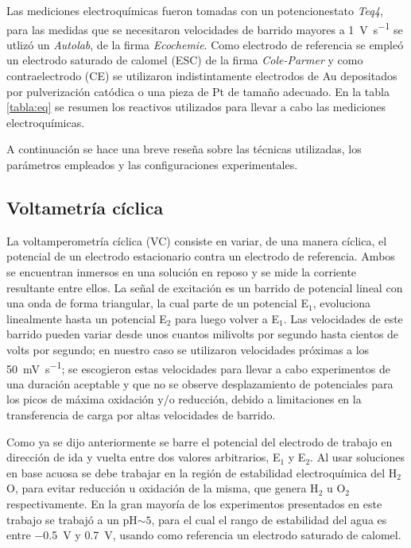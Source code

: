			Las mediciones electroquímicas fueron tomadas con un potencionestato \textit{Teq4}, para las medidas que se necesitaron velocidades de barrido mayores a \SI{1}{\volt\per\second} se utlizó un \textit{Autolab}, de la firma \textit{Ecochemie}. Como electrodo de referencia se empleó un electrodo saturado de calomel (ESC) de la firma \textit{Cole-Parmer} y como contraelectrodo (CE) se utilizaron indistintamente electrodos de Au depositados por pulverización catódica o una pieza de Pt de tamaño adecuado. En la tabla \ref{tabla:eq} se resumen los reactivos utilizados para llevar a cabo las mediciones electroquímicas. 
			
			A continuación se hace una breve reseña sobre las técnicas utilizadas, los parámetros empleados y las configuraciones experimentales.

			
				
				   		  	
	 \subsection{Voltametría cíclica}
	 		
	 		La voltamperometría cíclica (VC) consiste en variar, de una manera cíclica, el potencial de un electrodo estacionario contra un electrodo de referencia. Ambos se encuentran inmersos en una solución en reposo y se mide la corriente resultante entre ellos. La señal de excitación es un barrido de potencial lineal con una onda de forma triangular, la cual parte de un potencial E$_1$, evoluciona linealmente hasta un potencial E$_2$ para luego volver a E$_1$. Las velocidades de este barrido pueden variar desde unos cuantos milivolts por segundo hasta cientos de volts por segundo; en nuestro caso se utilizaron velocidades próximas a los \SI{50}{\milli\volt.\second^{-1}}; se escogieron estas velocidades para llevar a cabo experimentos de una duración aceptable y que no se observe desplazamiento de potenciales para los picos de máxima oxidación y/o reducción, debido a limitaciones en la transferencia de carga por altas velocidades de barrido. \cite{nicholson1964,Gewirth2004}

	 		Como ya se dijo anteriormente se barre el potencial del electrodo de trabajo en dirección de ida y vuelta entre dos valores arbitrarios, E$_1$ y E$_2$. Al usar soluciones en base acuosa se debe trabajar en la región de estabilidad electroquímica del H$_2$O, para evitar reducción u oxidación de la misma, que genera H$_2$ u O$_2$ respectivamente. En la gran mayoría de los experimentos presentados en este trabajo se trabajó a un pH$\sim 5$, para el cual el rango de estabilidad del agua es entre \SI{-0.5}{\volt} y \SI{0.7}{\volt}, usando como referencia un electrodo saturado de calomel.\cite{wang2014} 


